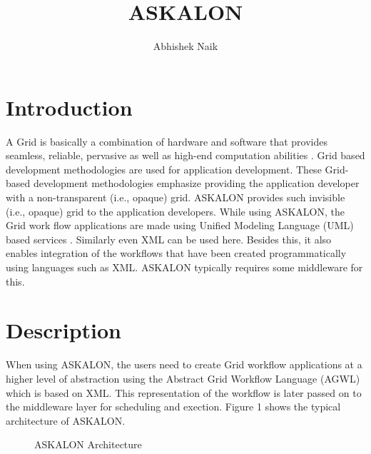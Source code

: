 \documentclass[9pt,twocolumn,twoside]{../../styles/osajnl}
\title{ASKALON}
\author[1,*]{Abhishek Naik}
\affil[1]{School of Informatics and Computing, Bloomington, IN 47408, U.S.A.}
\affil[*]{Corresponding authors: ahnaik@indiana.edu}
\begin{document}
\maketitle

\section{Introduction}

A Grid is basically a combination of hardware and software that
provides seamless, reliable, pervasive as well as high-end computation
abilities \cite{Workflow-book}.  Grid based development methodologies
are used for application development.  These Grid-based development
methodologies emphasize providing the application developer with a
non-transparent (i.e., opaque) grid.  ASKALON provides such invisible
(i.e., opaque) grid to the application developers.  While
using ASKALON, the Grid work flow applications are made using Unified
Modeling Language (UML) based services \cite{Workflow-book}.
Similarly even XML can be used here.  Besides this, it also enables
integration of the workflows that have been created programmatically
using languages such as XML.  ASKALON typically requires some
middleware for this.

\section{Description}

When using ASKALON, the users need to create Grid workflow
applications at a higher level of abstraction using the Abstract Grid
Workflow Language (AGWL) which is based on XML.  This representation
of the workflow is later passed on to the middleware layer for
scheduling and exection.  Figure 1 shows the typical architecture of
ASKALON.

\begin{figure}[htbp]
  \centering
  \caption{ASKALON Architecture \cite{Workflow-book}}
\end{figure}
\end{document}
